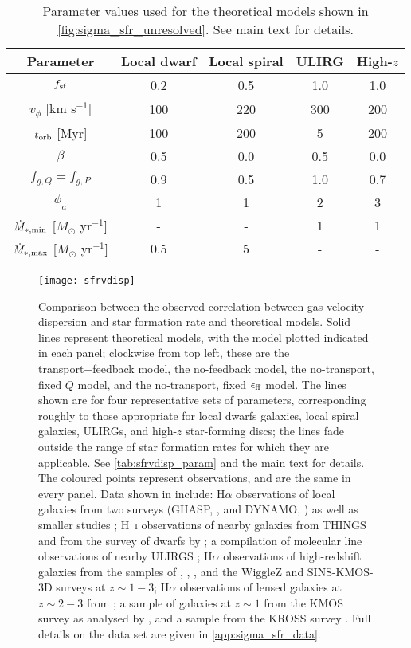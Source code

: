 \documentclass[useAMS,usenatbib]{mn2e}
\begin{document}
\begin{table}
\begin{tabular}{c@{$\quad$}cccc}
\hline
Parameter & Local dwarf & Local spiral & ULIRG & High-$z$ \\
\hline
$f_{\rm sf}$ & 0.2 & 0.5 & 1.0 & 1.0 \\
$v_\phi$ [km s$^{-1}$] & 100 & 220 & 300 & 200 \\
$t_{\rm orb}$ [Myr] & 100 & 200 & 5 & 200 \\
$\beta$ & 0.5 & 0.0 & 0.5 & 0.0 \\
$f_{g,Q} = f_{g,P}$ & 0.9 & 0.5 & 1.0 & 0.7 \\
$\phi_a$ & 1 & 1 & 2 & 3 \\
$\dot{M}_{*,\rm min}$ [$M_\odot$ yr$^{-1}$] & - & - & 1 & 1 \\
$\dot{M}_{*,\rm max}$ [$M_\odot$ yr$^{-1}$] & 0.5 & 5 & - & - \\
\hline
\end{tabular}
\caption{
\label{tab:sfrvdisp_param}
Parameter values used for the theoretical models shown in \autoref{fig:sigma_sfr_unresolved}. See main text for details.
}
\end{table}

\begin{figure*}
\texttt{[image: sfrvdisp]}
\caption{
\label{fig:sigma_sfr_unresolved}
Comparison between the observed correlation between gas velocity dispersion and star formation rate and theoretical models. Solid lines represent theoretical models, with the model plotted indicated in each panel; clockwise from top left, these are the transport+feedback model, the no-feedback model, the no-transport, fixed $Q$ model, and the no-transport, fixed $\epsilon_{\rm ff}$ model. The lines shown are for four representative sets of parameters, corresponding roughly to those appropriate for local dwarfs galaxies, local spiral galaxies, ULIRGs, and high-$z$ star-forming discs; the lines fade outside the range of star formation rates for which they are applicable. See \autoref{tab:sfrvdisp_param} and the main text for details. The coloured points represent observations, and are the same in every panel. Data shown in include: H$\alpha$ observations of local galaxies from two surveys (GHASP, \citealt{epinat08a}, and DYNAMO, \citealt{green14a}) as well as smaller studies \citep{moiseev15a, varidel16a}; H~\textsc{i} observations of nearby galaxies from THINGS \citep{leroy08a, walter08a, ianjamasimanana12a} and from the survey of dwarfs by \citet{stilp13a}; a compilation of molecular line observations of nearby ULIRGS \citep{downes98a, sanders03a, veilleux09a, scoville15a, scoville17a}; H$\alpha$ observations of high-redshift galaxies from the samples of \citet{epinat09a}, \citet{law09a}, \citet{lemoine-busserolle10a}, and the WiggleZ \citep{wisnioski11a} and SINS-KMOS-3D \citep{wisnioski15a, wuyts16a} surveys at $z\sim 1-3$; H$\alpha$ observations of lensed galaxies at $z\sim 2-3$ from \citet{jones10a}; a sample of galaxies at $z\sim 1$ from the KMOS survey \citep{wisnioski15a} as analysed by \citet{di-teodoro16a}, and a sample from the KROSS survey \citep{stott16a, johnson17a}. Full details on the data set are given in \autoref{app:sigma_sfr_data}.
}
\end{figure*}
\end{document}
